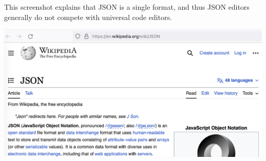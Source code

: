 
This screenshot explains that JSON is a single format,
and thus JSON editors generally do not compete with universal code editors.

\begin{center}
    \includegraphics[width=\textwidth]{json}
\end{center}

\pagebreak
